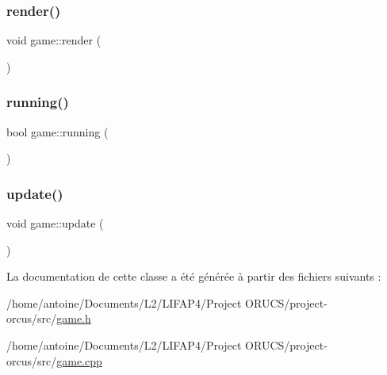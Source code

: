 \mbox{\label{classgame_aabb612769a8b4d11248f97a758bf48fa}} 
\subsubsection{\texorpdfstring{render()}{render()}}
{\footnotesize\ttfamily void game\+::render (\begin{DoxyParamCaption}{ }\end{DoxyParamCaption})}

\mbox{\label{classgame_aac32f595b4b5b8c36ea594badcbbde85}} 
\subsubsection{\texorpdfstring{running()}{running()}}
{\footnotesize\ttfamily bool game\+::running (\begin{DoxyParamCaption}{ }\end{DoxyParamCaption})}

\mbox{\label{classgame_a2be7307eb3c9065fc7c728edd68d0a78}} 
\subsubsection{\texorpdfstring{update()}{update()}}
{\footnotesize\ttfamily void game\+::update (\begin{DoxyParamCaption}{ }\end{DoxyParamCaption})}



La documentation de cette classe a été générée à partir des fichiers suivants \+:\begin{DoxyCompactItemize}
\item 
/home/antoine/\+Documents/\+L2/\+L\+I\+F\+A\+P4/\+Project O\+R\+U\+C\+S/project-\/orcus/src/\hyperlink{game_8h}{game.\+h}\item 
/home/antoine/\+Documents/\+L2/\+L\+I\+F\+A\+P4/\+Project O\+R\+U\+C\+S/project-\/orcus/src/\hyperlink{game_8cpp}{game.\+cpp}\end{DoxyCompactItemize}
